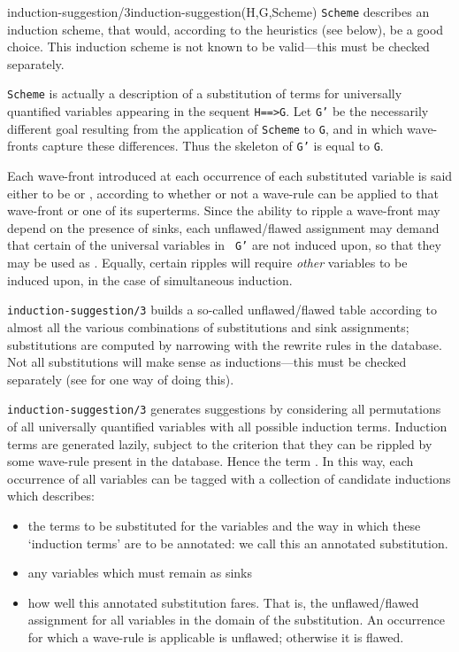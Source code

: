 \begin{predicate}{induction-suggestion/3}{induction-suggestion(H,G,Scheme)}%
{\tt Scheme} describes an induction scheme, that would, according to
the heuristics (see below), be a good choice.  This induction scheme
is not known to be valid---this must be checked separately.

{\tt Scheme} is actually a description of a substitution of terms for
universally quantified variables appearing in the sequent {\tt H==>G}.
Let {\tt G'} be the necessarily different goal resulting from the
application of {\tt Scheme} to {\tt G}, and in which wave-fronts
capture these differences.  Thus the skeleton of {\tt G'} is equal to
{\tt G}.

Each wave-front introduced at each occurrence of each substituted
variable is said either to be {\em{}\/} or {\em{}},
according to whether or not a wave-rule can be applied to that
wave-front or one of its superterms.  Since the ability to ripple a
wave-front may depend on the presence of sinks, each unflawed/flawed
assignment may demand that certain of the universal variables in {\tt
G'} are not induced upon, so that they may be used as .
Equally, certain ripples will require {\em other\/} variables to be
induced upon, in the case of simultaneous induction.


{\tt induction-suggestion/3} builds a so-called unflawed/flawed table
according to almost all the various combinations of substitutions and
sink assignments;  substitutions are computed by narrowing with the
rewrite rules in the database.  Not all substitutions will make sense
as inductions---this must be checked separately (see  for
one way of doing this).

{\tt induction-suggestion/3} generates suggestions by considering all
permutations of all universally quantified variables with all possible
induction terms.  Induction terms are generated lazily, subject to
the criterion that they can be rippled by some wave-rule present in
the database.  Hence the term {\em{}}.  In this way,
each occurrence of all variables can  be tagged with a collection of
candidate inductions which describes:
\begin{itemize}
\item
 the terms to be substituted for the variables and the way in which
 these  `induction terms' are to be annotated: we call this an
 annotated substitution.
\item any variables which must remain as sinks
\item how well this annotated substitution fares.  That is, the
 unflawed/flawed assignment for all variables in the domain of the
substitution.  An occurrence for which a wave-rule is applicable is
unflawed; otherwise it is flawed.
\end{itemize}



\end{predicate}
